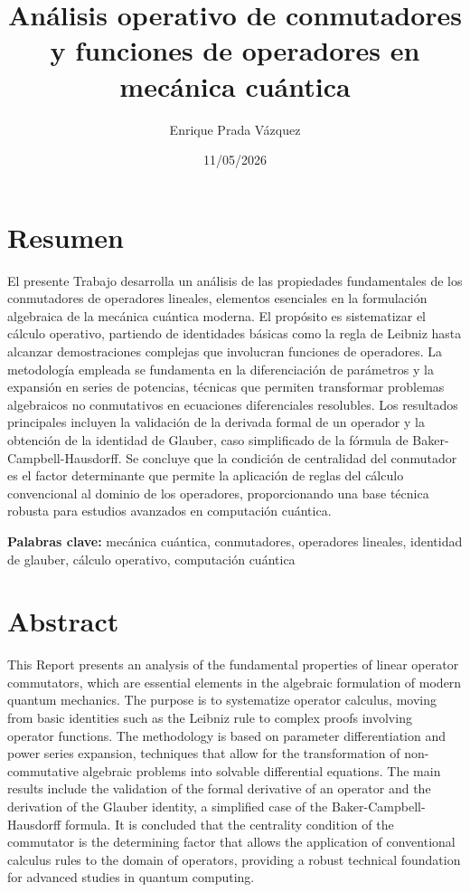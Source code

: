 \documentclass[11pt,a4paper,spanish]{book}
\title{Análisis operativo de conmutadores y funciones de operadores en mecánica cuántica}
\author{Enrique Prada Vázquez}
\date{11/05/2026}
\begin{document}
\renewcommand{\listfigurename}{Índice de figuras}
\renewcommand{\listtablename}{Índice de tablas}
\renewcommand{\contentsname}{Índice de contenidos}
\renewcommand{\figurename}{Figura}
\renewcommand{\tablename}{Tabla} 

\maketitle
\frontmatter
\tableofcontents

\chapter{Resumen}
El presente Trabajo desarrolla un análisis de las propiedades fundamentales de los conmutadores de operadores lineales, elementos esenciales en la formulación algebraica de la mecánica cuántica moderna. El propósito es sistematizar el cálculo operativo, partiendo de identidades básicas como la regla de Leibniz hasta alcanzar demostraciones complejas que involucran funciones de operadores. La metodología empleada se fundamenta en la diferenciación de parámetros y la expansión en series de potencias, técnicas que permiten transformar problemas algebraicos no conmutativos en ecuaciones diferenciales resolubles. Los resultados principales incluyen la validación de la derivada formal de un operador y la obtención de la identidad de Glauber, caso simplificado de la fórmula de Baker-Campbell-Hausdorff. Se concluye que la condición de centralidad del conmutador es el factor determinante que permite la aplicación de reglas del cálculo convencional al dominio de los operadores, proporcionando una base técnica robusta para estudios avanzados en computación cuántica.

\vspace{0.5cm}
{\bf Palabras clave:} mecánica cuántica, conmutadores, operadores lineales, identidad de glauber, cálculo operativo, computación cuántica

\chapter{Abstract}
This Report presents an analysis of the fundamental properties of linear operator commutators, which are essential elements in the algebraic formulation of modern quantum mechanics. The purpose is to systematize operator calculus, moving from basic identities such as the Leibniz rule to complex proofs involving operator functions. The methodology is based on parameter differentiation and power series expansion, techniques that allow for the transformation of non-commutative algebraic problems into solvable differential equations. The main results include the validation of the formal derivative of an operator and the derivation of the Glauber identity, a simplified case of the Baker-Campbell-Hausdorff formula. It is concluded that the centrality condition of the commutator is the determining factor that allows the application of conventional calculus rules to the domain of operators, providing a robust technical foundation for advanced studies in quantum computing.
\end{document}
